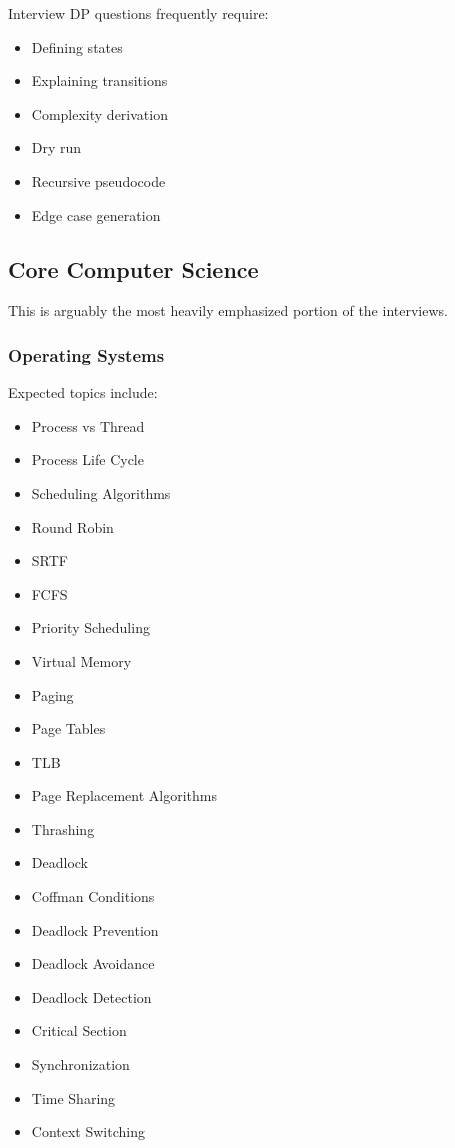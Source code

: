 \documentclass[11pt,a4paper]{article}
\begin{document}
Interview DP questions frequently require:

\begin{itemize}
	\item Defining states
	\item Explaining transitions
	\item Complexity derivation
	\item Dry run
	\item Recursive pseudocode
	\item Edge case generation
\end{itemize}


\subsection{Core Computer Science}

This is arguably the most heavily emphasized portion of the interviews.

\subsubsection{Operating Systems}

Expected topics include:

\begin{itemize}
	\item Process vs Thread
	\item Process Life Cycle
	\item Scheduling Algorithms
	\item Round Robin
	\item SRTF
	\item FCFS
	\item Priority Scheduling
	\item Virtual Memory
	\item Paging
	\item Page Tables
	\item TLB
	\item Page Replacement Algorithms
	\item Thrashing
	\item Deadlock
	\item Coffman Conditions
	\item Deadlock Prevention
	\item Deadlock Avoidance
	\item Deadlock Detection
	\item Critical Section
	\item Synchronization
	\item Time Sharing
	\item Context Switching
\end{itemize}
\end{document}
